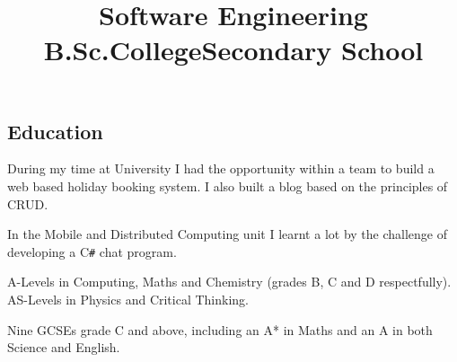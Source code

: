 \documentclass[line,margin]{res}
\newcommand{\ampersand}{\&}
\newcommand{\CSharp}{C\texttt{\#}}
\begin{document}
\begin{resume}
\section{Education}

\title{Software Engineering B.Sc.} %
\begin{position}
During my time at University I had the opportunity within a team to build a web based holiday booking system.
I also built a blog based on the principles of CRUD.

In the Mobile and Distributed Computing unit I learnt a lot by the challenge of developing a {\CSharp} chat program.
\end{position}

\title{College}
\begin{position}
A-Levels in Computing, Maths and Chemistry (grades B, C and D respectfully). \\
AS-Levels in Physics and Critical Thinking.

\begin{comment}
\begin{tabular}{ l r r }
	Computing & A Level & B \\
	Maths & A Level & C \\
	Chemistry & A Level & D \\
	Physics & AS Level & D \\
	Critical Thinking & AS Level & E \\
\end{tabular}
\end{comment}
\end{position}

\title{Secondary School}
\begin{position}
Nine GCSEs grade C and above, including an A* in Maths and an A in both Science and English.

\begin{comment}
\begin{tabular}{ l r r }
	Mathematics & (a year early) GCSE & A* \\
	Science & Double Award GCSE & AA \\
	English & GCSE & A \\
	History & GCSE & B \\
	Systems {\ampersand} Control & GCSE & B \\
	ICT & Short Course GCSE & C \\
	Statistics & GCSE & C \\
	English Literature & GCSE & C \\
	Geography & GCSE & D \\
	Drama & GCSE & F \\
\end{tabular}
\end{comment}
\end{position}


\end{resume}
\end{document}
